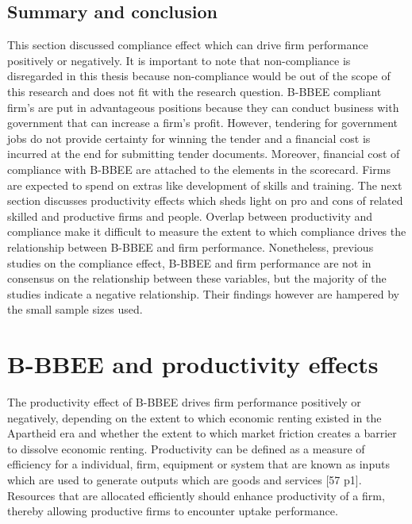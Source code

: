 \subsection{Summary and conclusion}
This section discussed compliance effect which can drive firm performance positively or negatively. It is important to note that non-compliance is disregarded in this thesis because non-compliance would be out of the scope of this research and does not fit with the research question. B-BBEE compliant firm’s are put in advantageous positions because they can conduct business with government that can increase a firm’s profit. However, tendering for government jobs do not provide certainty for winning the tender and a financial cost is incurred at the end for submitting tender documents. Moreover, financial cost of compliance with B-BBEE are attached to the elements in the scorecard. Firms are expected to spend on extras like development of skills and training. The next section discusses productivity effects which sheds light on pro and cons of related skilled and productive firms and people. Overlap between productivity and compliance make it difficult to measure the extent to which compliance drives the relationship between B-BBEE and firm performance. Nonetheless, previous studies on the compliance effect, B-BBEE and firm performance are not in consensus on the relationship between these variables, but the majority of the studies indicate a negative relationship. Their findings however are hampered by the  small sample sizes used. 
\section{B-BBEE and productivity effects}
The productivity effect of B-BBEE drives firm performance positively or negatively, depending on the extent to which economic renting existed in the Apartheid era and whether the extent to which market friction creates a barrier to dissolve economic renting. Productivity can be defined as a measure of efficiency for a individual, firm, equipment or system that are known as inputs which are used to generate outputs which are goods and services [57 p1]. Resources that are allocated efficiently should enhance productivity of a firm, thereby allowing productive firms to encounter uptake performance.
